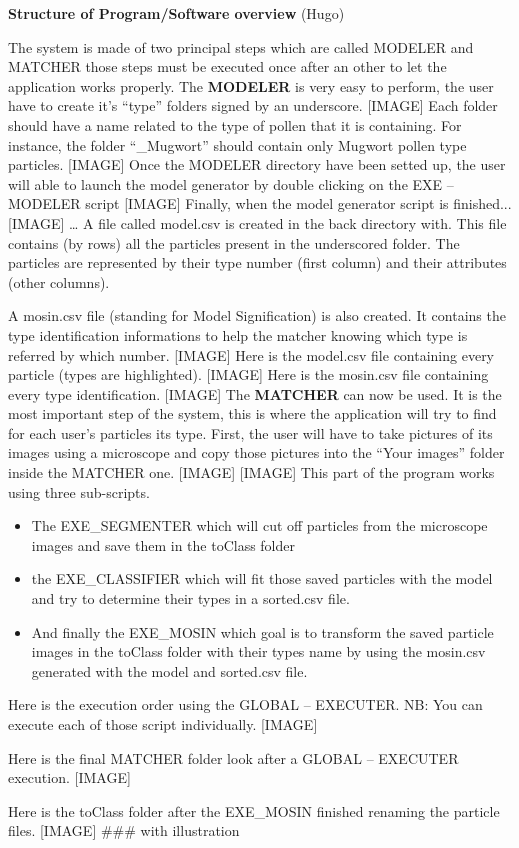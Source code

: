 \textbf{Structure of Program/Software overview} (Hugo) 

The system is made of two principal steps which are called MODELER and MATCHER those steps must be executed once after an other to let the application works properly.
The \textbf{MODELER} is very easy to perform, the user have to create it's “type” folders signed by an underscore.
[IMAGE]
Each folder should have a name related to the type of pollen that it is containing. For instance, the folder “_Mugwort” should contain only Mugwort pollen type particles.
[IMAGE]
Once the MODELER directory have been setted up, the user will able to launch the model generator by double clicking on the EXE – MODELER script
[IMAGE]
Finally, when the model generator script is finished...
[IMAGE]
… A file called model.csv is created in the back directory with. This file contains (by rows) all the particles present in the underscored folder. The particles are represented by their type number (first column) and their attributes (other columns).

A mosin.csv file (standing for Model Signification) is also created. It contains the type identification informations to help the matcher knowing which type is referred by which number.
[IMAGE]
Here is the model.csv file containing every particle (types are highlighted).
[IMAGE]
Here is the mosin.csv file containing every type identification.
[IMAGE]
The \textbf{MATCHER} can now be used. It is the most important step of the system, this is where the application will try to find for each user's particles its type.
First, the user will have to take pictures of its images using a microscope and copy those pictures into the “Your images” folder inside the MATCHER one.
[IMAGE]
[IMAGE]
This part of the program works using three sub-scripts.

\begin{itemize}
\item The EXE_SEGMENTER which will cut off particles from the microscope images and save them in the toClass folder

\item the EXE_CLASSIFIER which will fit those saved particles with the model and try to determine their types in a sorted.csv file.

\item And finally the EXE_MOSIN which goal is to transform the saved particle images in the toClass folder with their types name by using the mosin.csv generated with the model and sorted.csv file.
\end{itemize}

Here is the execution order using the GLOBAL – EXECUTER.
NB: You can execute each of those script individually.
[IMAGE]

Here is the final MATCHER folder look after a GLOBAL – EXECUTER execution.
[IMAGE]

Here is the toClass folder after the EXE_MOSIN finished renaming the particle files.
[IMAGE]
### with illustration
    
    
    
    
    
    
    
    
    
    